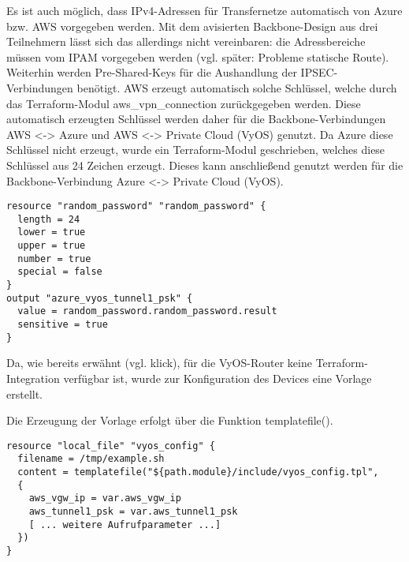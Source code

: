 Es ist auch möglich, dass IPv4-Adressen für Transfernetze automatisch von Azure bzw. AWS vorgegeben werden. Mit dem avisierten Backbone-Design aus drei Teilnehmern lässt sich das allerdings nicht vereinbaren: die Adressbereiche müssen vom IPAM vorgegeben werden (vgl. später: Probleme statische Route).\\
Weiterhin werden Pre-Shared-Keys für die Aushandlung der IPSEC-Verbindungen benötigt. AWS erzeugt automatisch solche Schlüssel, welche durch das Terraform-Modul \glqq aws\_vpn\_connection\grqq{} zurückgegeben werden. Diese automatisch erzeugten Schlüssel werden daher für die Backbone-Verbindungen AWS <-> Azure und AWS <-> Private Cloud (VyOS) genutzt. Da Azure diese Schlüssel nicht erzeugt, wurde ein Terraform-Modul geschrieben, welches diese Schlüssel aus 24 Zeichen erzeugt. Dieses kann anschließend genutzt werden für die Backbone-Verbindung Azure <-> Private Cloud (VyOS).

\begin{lstlisting}[label=tf-generate-psk,caption=Auf Sonderzeichen (special) wurde verzichtet. Das Modul stellt per output-Anweisung den Schlüssel für andere Terraform-Module zur Verfügung.]
resource "random_password" "random_password" {
  length = 24
  lower = true
  upper = true
  number = true
  special = false
}
output "azure_vyos_tunnel1_psk" {
  value = random_password.random_password.result
  sensitive = true
}
\end{lstlisting}

Da, wie bereits erwähnt (vgl. klick), für die VyOS-Router keine Terraform-Integration verfügbar ist, wurde zur Konfiguration des Devices eine Vorlage erstellt.

Die Erzeugung der Vorlage erfolgt über die Funktion templatefile().

\begin{lstlisting}[label=tf-call-tpl-generation,caption=Die Funktion templatefile() erzeugt aus einer Template-Datei (vyos\_config.tpl) die Datei /tmp/example.sh. Die Template-Datei wird mit den Variablen var.aws\_vgw\_ip und aws\_tunnel1\_psk befüllt.]
resource "local_file" "vyos_config" {
  filename = /tmp/example.sh
  content = templatefile("${path.module}/include/vyos_config.tpl",
  {
    aws_vgw_ip = var.aws_vgw_ip
    aws_tunnel1_psk = var.aws_tunnel1_psk
    [ ... weitere Aufrufparameter ...]
  })
}
\end{lstlisting}


